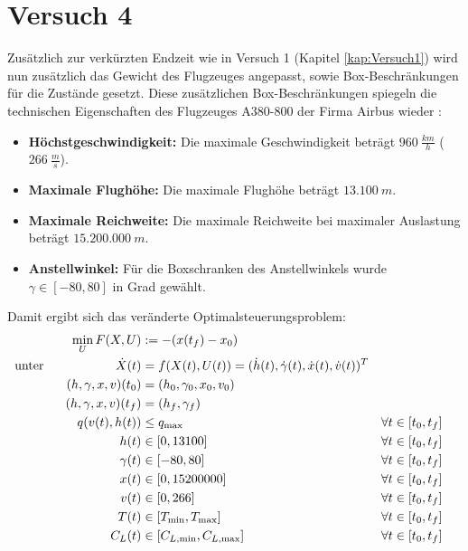 \section{Versuch 4}\label{kap:Versuch4}
Zusätzlich zur verkürzten Endzeit wie in Versuch 1 (Kapitel \ref{kap:Versuch1}) wird nun zusätzlich das Gewicht des Flugzeuges angepasst, sowie Box-Beschränkungen für die Zustände gesetzt. Diese zusätzlichen Box-Beschränkungen spiegeln die technischen Eigenschaften des Flugzeuges A380-800 der Firma Airbus wieder \cite{A380Tech}:
\begin{itemize}
\item \textbf{Höchstgeschwindigkeit:} Die maximale Geschwindigkeit beträgt $960 \ \frac{km}{h}$ ($266 \ \frac{m}{s}$).
%
\item \textbf{Maximale Flughöhe:} Die maximale Flughöhe beträgt $13.100 \ m$.
%
\item \textbf{Maximale Reichweite:} Die maximale Reichweite bei maximaler Auslastung beträgt $15.200.000 \ m$.
%
\item \textbf{Anstellwinkel:} Für die Boxschranken des Anstellwinkels wurde $\gamma \in [-80,80]$ in Grad gewählt. 
\end{itemize}
Damit ergibt sich das veränderte Optimalsteuerungsproblem:
\begin{align*}
\min_{U} F(X,U) &:= -(x(t_f) - x_0) \\
\text{unter} \hspace{20mm} \dot{X}(t) &= f(X(t),U(t)) = (\dot{h}(t),\dot{\gamma}(t),\dot{x}(t),\dot{v}(t))^T \\
(h,\gamma,x,v)(t_0) &= (h_0,\gamma_0,x_0,v_0) \\
(h,\gamma,x,v)(t_f) &= (h_f,\gamma_f) \hspace{36mm} \\
q(v(t),h(t)) &\leq q_{\max} & & \forall t \in [t_0,t_f] \\
h(t) &\in [0,13100] & & \forall t \in [t_0,t_f] \\
\gamma(t) &\in [-80,80] & & \forall t \in [t_0,t_f] \\
x(t) &\in [0,15200000] & & \forall t \in [t_0,t_f] \\
v(t) &\in [0,266] & & \forall t \in [t_0,t_f] \\
T(t) &\in [T_{\min},T_{\max}] & & \forall t \in [t_0,t_f] \\
C_L(t) &\in [C_{L, \min},C_{L, \max}] & & \forall t \in [t_0,t_f]
\end{align*}


